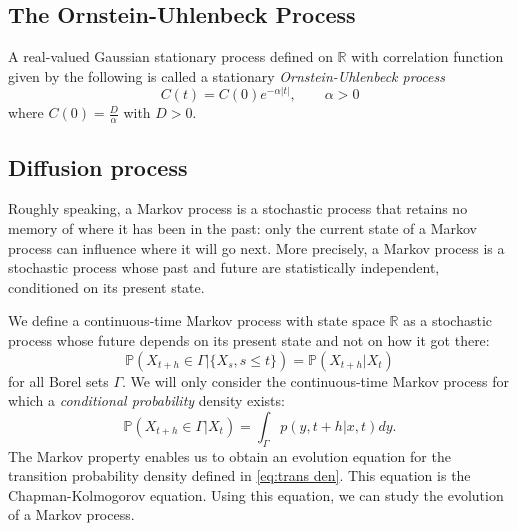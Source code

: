 \documentclass{article}
\begin{document}
\subsection*{The Ornstein-Uhlenbeck Process}
A real-valued Gaussian stationary process defined on $\mathbb{R}$ with correlation function given by the following is called a stationary \textit{Ornstein-Uhlenbeck process}
$$C(t)=C(0)e^{-\alpha |t|}, \qquad \alpha>0$$
where $C(0)=\frac{D}{\alpha}$ with $D>0$.
\subsection*{Diffusion process}
Roughly speaking, a Markov process is a stochastic process that retains no memory of where it has been in the past: only the current state of a Markov process can influence where it will go next. More precisely, a Markov process is a stochastic process whose past and future are statistically independent, conditioned on its present state.

\noindent We define a continuous-time Markov process with state space $\mathbb{R}$ as a stochastic process whose future depends on its present state and not on how it got there:
$$\mathbb{P}(X_{t+h}\in\Gamma | \{X_s,s\leq t\}) = \mathbb{P}(X_{t+h}|X_t)$$
for all Borel sets $\Gamma$. We will only consider the continuous-time Markov process for which a \textit{conditional probability} density exists:
\begin{equation}
\mathbb{P}(X_{t+h}\in \Gamma |X_t)=\int_{\Gamma} p(y,t+h|x,t)dy.\label{eq:trans den}
\end{equation}
The Markov property enables us to obtain an evolution equation for the transition probability density defined in \eqref{eq:trans den}. This equation is the Chapman-Kolmogorov equation. Using this equation, we can study the evolution of a Markov process.
\end{document}
